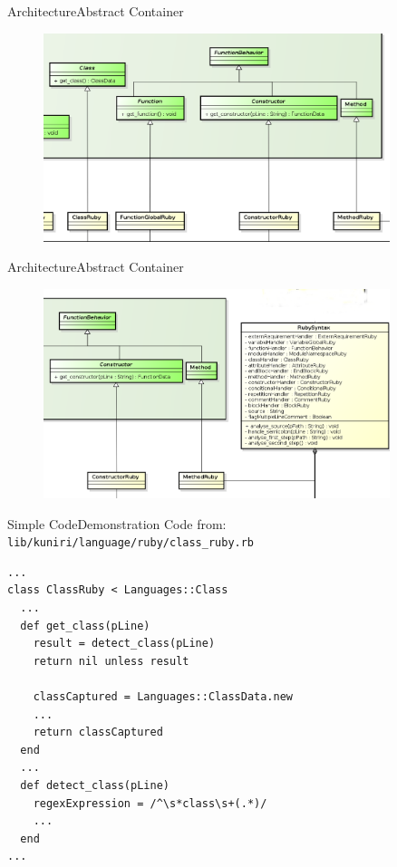 \documentclass[10pt]{beamer}
\begin{document}
\begin{frame}{Architecture}{Abstract Container}
  \begin{figure}[overview]
    \includegraphics[width=0.9\textwidth]{images/abstractContainerClasses.png}
  \end{figure}
\end{frame}

\begin{frame}{Architecture}{Abstract Container}
  \begin{figure}[overview]
    \includegraphics[width=0.9\textwidth]{images/abstractContainerConcrete.png}
  \end{figure}
\end{frame}

\begin{frame}[fragile]{Simple Code}{Demonstration}
Code from:
\verb|lib/kuniri/language/ruby/class_ruby.rb|
\small
\begin{lstlisting}
...
class ClassRuby < Languages::Class
  ...
  def get_class(pLine)
    result = detect_class(pLine)
    return nil unless result

    classCaptured = Languages::ClassData.new
    ...
    return classCaptured
  end
  ...
  def detect_class(pLine)
    regexExpression = /^\s*class\s+(.*)/
    ...
  end
...
\end{lstlisting}
\end{frame}
\end{document}
